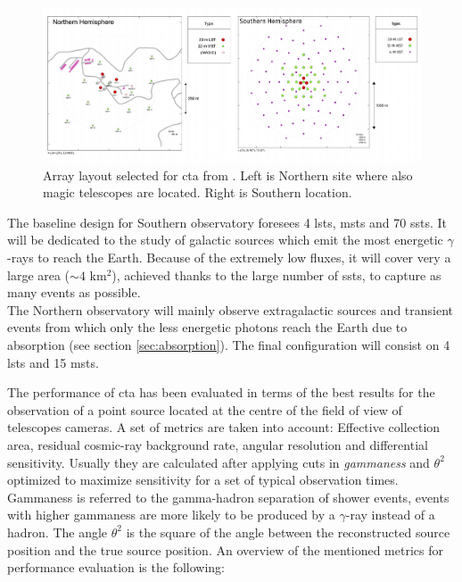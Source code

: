 \documentclass[main.tex]{subfiles}
\begin{document}
\begin{figure}
\centering
 \includegraphics[width=1\textwidth]{Pictures/Array-Layouts.pdf}
  \caption{Array layout selected for \gls{cta} from \cite{CTAPerformance}. Left is Northern site where also \gls{magic} telescopes are located. Right is Southern location.}
    \label{fig:arraylayout}
\end{figure}

The baseline design for Southern observatory foresees 4 \glspl{lst}, \glspl{mst} and 70 \glspl{sst}. It will be dedicated to the study of galactic sources which emit the most energetic $\gamma$-rays to reach the Earth. Because of the extremely low fluxes, it will cover very a large area ($\sim4$ km$^2$), achieved thanks to the large number of \glspl{sst}, to capture as many events as possible.\\
The Northern observatory will mainly observe extragalactic sources and transient events from which only the less energetic photons reach the Earth due to absorption (see section \ref{sec:absorption}). The final configuration will consist on 4 \glspl{lst} and 15 \glspl{mst}.

The performance of \gls{cta} has been evaluated in terms of the best results for the observation of a point source located at the centre of the field of view of telescopes cameras. A set of metrics are taken into account: Effective collection area, residual cosmic-ray background rate, angular resolution and differential sensitivity. Usually they are calculated after applying cuts in \textit{gammaness} and $\theta^2$ optimized to maximize sensitivity for a set of typical observation times. Gammaness is referred to the gamma-hadron separation of shower events, events with higher gammaness are more likely to be produced by a $\gamma$-ray instead of a hadron. The angle $\theta^2$ is the square of the angle between the reconstructed source position and the true source position.
An overview of the mentioned metrics for performance evaluation is the following:\\
\end{document}
